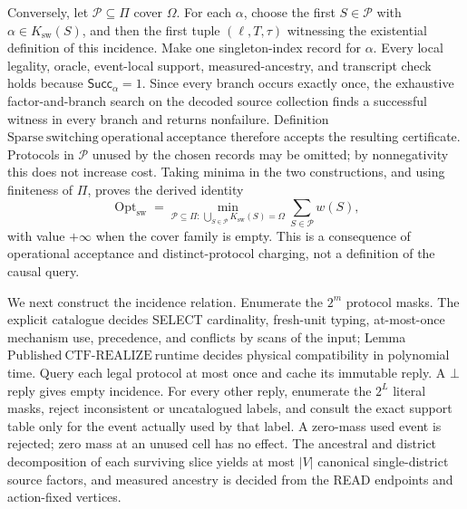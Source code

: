 Conversely, let \(\mathcal P\subseteq\Pi\) cover \(\Omega\).  For each \(\alpha\), choose the first \(S\in\mathcal P\) with \(\alpha\in K_{\mathrm{sw}}(S)\), and then the first tuple \((\ell,T,\tau)\) witnessing the existential definition of this incidence.  Make one singleton-index record for \(\alpha\).  Every local legality, oracle, event-local support, measured-ancestry, and transcript check holds because \(\mathsf{Succ}_{\alpha}=1\).  Since every branch occurs exactly once, the exhaustive factor-and-branch search on the decoded source collection finds a successful witness in every branch and returns nonfailure.  Definition~\(\mathrm{Sparse\ switching\ operational\ acceptance}\) therefore accepts the resulting certificate.  Protocols in \(\mathcal P\) unused by the chosen records may be omitted; by nonnegativity this does not increase cost.  Taking minima in the two constructions, and using finiteness of \(\Pi\), proves the derived identity
\[
 \operatorname{Opt}_{\mathrm{sw}}
 =\min_{\mathcal P\subseteq\Pi:\,\bigcup_{S\in\mathcal P}K_{\mathrm{sw}}(S)=\Omega}
   \sum_{S\in\mathcal P}w(S),
 \tag{15}
\]
with value \(+\infty\) when the cover family is empty.  This is a consequence of operational acceptance and distinct-protocol charging, not a definition of the causal query.

We next construct the incidence relation.  Enumerate the \(2^m\) protocol masks.  The explicit catalogue decides SELECT cardinality, fresh-unit typing, at-most-once mechanism use, precedence, and conflicts by scans of the input; Lemma~\(\mathrm{Published\ CTF\mbox{-}REALIZE\ runtime}\) decides physical compatibility in polynomial time.  Query each legal protocol at most once and cache its immutable reply.  A \(\bot\) reply gives empty incidence.  For every other reply, enumerate the \(2^L\) literal masks, reject inconsistent or uncatalogued labels, and consult the exact support table only for the event actually used by that label.  A zero-mass used event is rejected; zero mass at an unused cell has no effect.  The ancestral and district decomposition of each surviving slice yields at most \(|V|\) canonical single-district source factors, and measured ancestry is decided from the READ endpoints and action-fixed vertices.

